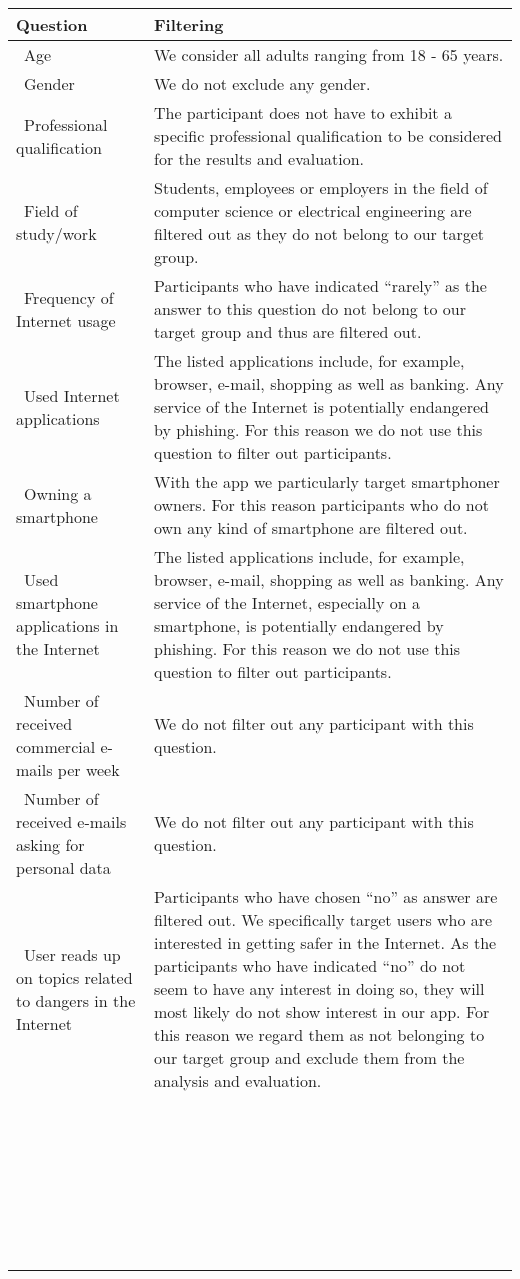 \begin{center}
    \begin{tabular}{ | p{5cm} | p{10cm} |}
    \hline\textbf{Question} & \textbf{Filtering}  \\  \hline
		\hline\  Age & We consider all adults ranging from 18 - 65 years. \\
    \hline\  Gender & We do not exclude any gender. \\ 
    \hline\  Professional qualification & The participant does not have to exhibit a specific professional qualification to be considered for the results and evaluation. \\ 
		\hline\  Field of study/work & Students, employees or employers in the field of computer science or electrical engineering are filtered out as they do not belong to our target group. \\ 
	  \hline\ Frequency of Internet usage & Participants who have indicated ``rarely'' as the answer to this question do not belong to our target group and thus are filtered out. \\ 
	  \hline\ Used Internet applications  &  The listed applications include, for example, browser, e-mail, shopping as well as banking. Any service of the Internet is potentially endangered by phishing. For this reason we do not use this question to filter out participants.\\ 
    \hline\ Owning a smartphone  & With the app we particularly target smartphoner owners. For this reason participants who do not own any kind of smartphone are filtered out. \\
		\hline\ Used smartphone applications in the Internet  & The listed applications include, for example, browser, e-mail, shopping as well as banking. Any service of the Internet, especially on a smartphone, is potentially endangered by phishing. For this reason we do not use this question to filter out participants. \\
    \hline\ Number of received commercial e-mails per week  & We do not filter out any participant with this question. \\
    \hline\ Number of received e-mails asking for personal data  & We do not filter out any participant with this question. \\
    \hline\ User reads up on topics related to dangers in the Internet  &  Participants who have chosen ``no'' as answer are filtered out. We specifically target users who are interested in getting safer in the Internet. As the participants who have indicated ``no'' do not seem to have any interest in doing so, they will most likely do not show interest in our app. For this reason we regard them as not belonging to our target group and exclude them from the analysis and evaluation.\\
    \hline\   &  \\
		\hline\   &  \\
    \hline\   &  \\
    \hline\   &  \\
    \hline\   &  \\
    \hline\   &  \\



\end{tabular}
\end{center}
